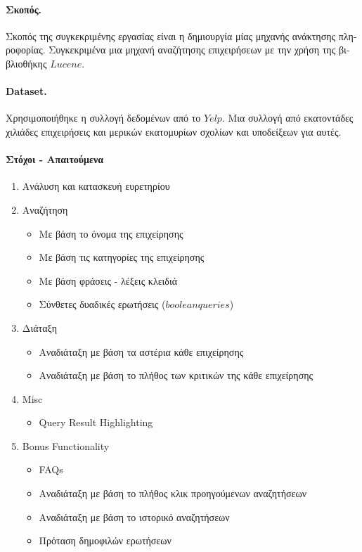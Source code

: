\paragraph {\textgreek{Σκοπός.}}
\textgreek{Σκοπός της συγκεκριμένης εργασίας είναι η δημιουργία μίας μηχανής
ανάκτησης πληροφορίας. Συγκεκριμένα μια μηχανή αναζήτησης επιχειρήσεων
με την χρήση της βιβλιοθήκης $Lucene$.}

\paragraph{Dataset.}
\textgreek {
    Χρησιμοποιήθηκε η συλλογή δεδομένων από το $Yelp$. Μια συλλογή από εκατοντάδες χιλιάδες επιχειρήσεις και μερικών εκατομυρίων
    σχολίων και υποδείξεων για αυτές.
}

\paragraph{\textgreek{Στόχοι - Απαιτούμενα}}
\begin{enumerate}
    \item \textgreek{Ανάλυση και κατασκευή ευρετηρίου}
    \item \textgreek{Αναζήτηση}
        \begin{itemize}
            \item \textgreek {Με βάση το όνομα της επιχείρησης}
            \item \textgreek {Με βάση τις κατηγορίες της επιχείρησης}
            \item \textgreek {Με βάση φράσεις - λέξεις κλειδιά}
            \item \textgreek {Σύνθετες δυαδικές ερωτήσεις ($boolean queries$)}
        \end{itemize}
    \item \textgreek{Διάταξη}
        \begin{itemize}
            \item \textgreek{Αναδιάταξη με βάση τα αστέρια κάθε επιχείρησης}
            \item \textgreek{Αναδιάταξη με βάση το πλήθος των κριτικών της κάθε επιχείρησης}
        \end{itemize}
    \item Misc
        \begin{itemize}
            \item Query Result Highlighting
        \end{itemize}
    \item {Bonus Functionality}
        \begin{itemize}
            \item FAQs
            \item\textgreek{Αναδιάταξη με βάση το πλήθος κλικ προηγούμενων αναζητήσεων}
            \item\textgreek{Αναδιάταξη με βάση το ιστορικό αναζητήσεων}
            \item\textgreek{Πρόταση δημοφιλών ερωτήσεων}
        \end{itemize}
\end{enumerate}
